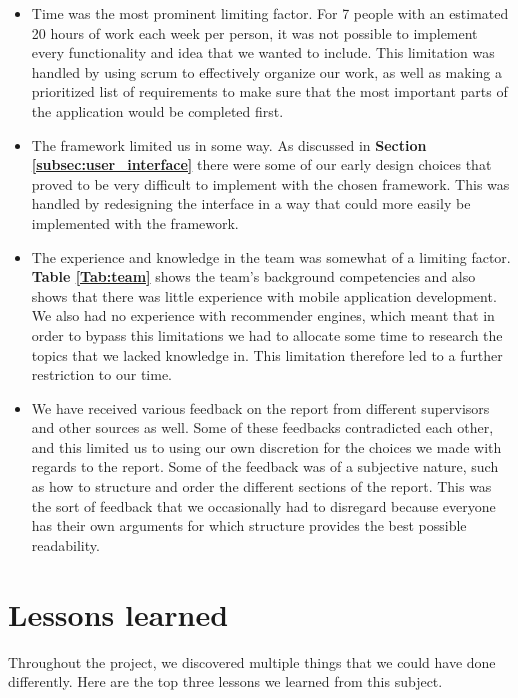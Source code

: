\begin{itemize}
\item Time was the most prominent limiting factor. For 7 people with an estimated 20 hours of work each week per person, it was not possible to implement every functionality and idea that we wanted to include. This limitation was handled by using scrum to effectively organize our work, as well as making a prioritized list of requirements to make sure that the most important parts of the application would be completed first.

\item The framework limited us in some way. As discussed in \textbf{Section \ref{subsec:user_interface}} there were some of our early design choices that proved to be very difficult to implement with the chosen framework. This was handled by redesigning the interface in a way that could more easily be implemented with the framework. 

\item The experience and knowledge in the team was somewhat of a limiting factor. \textbf{Table \ref{Tab:team}} shows the team's background competencies and also shows that there was little experience with mobile application development. We also had no experience with recommender engines, which meant that in order to bypass this limitations we had to allocate some time to research the topics that we lacked knowledge in. This limitation therefore led to a further restriction to our time.

\item We have received various feedback on the report from different supervisors and other sources as well. Some of these feedbacks contradicted each other, and this limited us to using our own discretion for the choices we made with regards to the report. Some of the feedback was of a subjective nature, such as how to structure and order the different sections of the report. This was the sort of feedback that we occasionally had to disregard because everyone has their own arguments for which structure provides the best possible readability.

\end{itemize}

\section{Lessons learned}

Throughout the project, we discovered multiple things that we could have done differently. Here are the top three lessons we learned from this subject.

